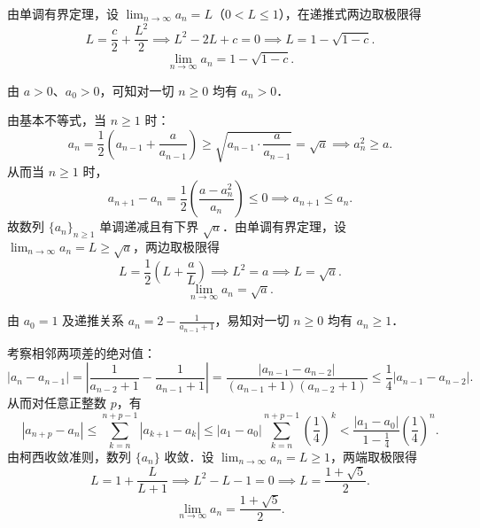 \begin{solution}
    由单调有界定理，设 $\lim_{n\to\infty} a_n = L$（$0 < L \leqslant 1$），在递推式两边取极限得
    \begin{equation}
        L = \frac{c}{2} + \frac{L^2}{2} \implies L^2 - 2L + c = 0 \implies L = 1 - \sqrt{1 - c}.
    \end{equation}
    \begin{equation}
        \boxed{\lim_{n\to\infty} a_n = 1 - \sqrt{1 - c}.}
    \end{equation}


    由 $a > 0$、$a_0 > 0$，可知对一切 $n \geqslant 0$ 均有 $a_n > 0$．

    由基本不等式，当 $n \geqslant 1$ 时：
    \begin{equation}
        a_n = \frac{1}{2} \left( a_{n-1} + \frac{a}{a_{n-1}} \right) \geqslant \sqrt{a_{n-1} \cdot \frac{a}{a_{n-1}}} = \sqrt{a} \implies a_n^2 \geqslant a.
    \end{equation}
    从而当 $n \geqslant 1$ 时，
    \begin{equation}
        a_{n+1} - a_n = \frac{1}{2} \left( \frac{a - a_n^2}{a_n} \right) \leqslant 0 \implies a_{n+1} \leqslant a_n.
    \end{equation}
    故数列 $\{a_n\}_{n\geqslant 1}$ 单调递减且有下界 $\sqrt{a}$．由单调有界定理，设 $\lim_{n\to\infty} a_n = L \geqslant \sqrt{a}$，两边取极限得
    \begin{equation}
        L = \frac{1}{2} \left( L + \frac{a}{L} \right) \implies L^2 = a \implies L = \sqrt{a}.
    \end{equation}
    \begin{equation}
        \boxed{\lim_{n\to\infty} a_n = \sqrt{a}.}
    \end{equation}


    由 $a_0 = 1$ 及递推关系 $a_n = 2 - \frac{1}{a_{n-1} + 1}$，易知对一切 $n \geqslant 0$ 均有 $a_n \geqslant 1$．

    考察相邻两项差的绝对值：
    \begin{equation}
        |a_n - a_{n-1}| = \left| \frac{1}{a_{n-2} + 1} - \frac{1}{a_{n-1} + 1} \right| = \frac{|a_{n-1} - a_{n-2}|}{(a_{n-1} + 1)(a_{n-2} + 1)} \leqslant \frac{1}{4} |a_{n-1} - a_{n-2}|.
    \end{equation}
    从而对任意正整数 $p$，有
    \begin{equation}
        |a_{n+p} - a_n| \leqslant \sum_{k=n}^{n+p-1} |a_{k+1} - a_k| \leqslant |a_1 - a_0| \sum_{k=n}^{n+p-1} \left( \frac{1}{4} \right)^k < \frac{|a_1 - a_0|}{1 - \frac{1}{4}} \left( \frac{1}{4} \right)^n.
    \end{equation}
    由柯西收敛准则，数列 $\{a_n\}$ 收敛．设 $\lim_{n\to\infty} a_n = L \geqslant 1$，两端取极限得
    \begin{equation}
        L = 1 + \frac{L}{L + 1} \implies L^2 - L - 1 = 0 \implies L = \frac{1 + \sqrt{5}}{2}.
    \end{equation}
    \begin{equation}
        \boxed{\lim_{n\to\infty} a_n = \frac{1 + \sqrt{5}}{2}.}
    \end{equation}


\end{solution}

